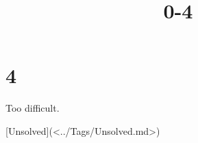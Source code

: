 \documentclass{article}
\title{0-4}
\begin{document}
\maketitle

\section*{4}

Too difficult.

[Unsolved](<../Tags/Unsolved.md>)
\end{document}
